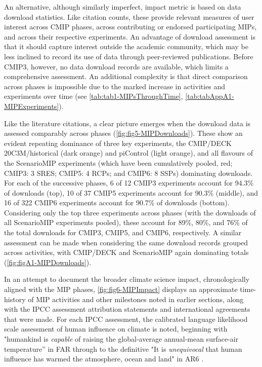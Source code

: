 \documentclass[manuscript]{copernicus}
\begin{document}
An alternative, although similarly imperfect, impact metric is based on data download statistics. Like citation counts, these provide relevant measures of user interest across CMIP phases, across contributing or endorsed participating MIPs, and across their respective experiments. An advantage of download assessment is that it should capture interest outside the academic community, which may be less inclined to record its use of data through peer-reviewed publications. Before CMIP3, however, no data download records are available, which limits a comprehensive assessment. An additional complexity is that direct comparison across phases is impossible due to the marked increase in activities and experiments over time (see \autoref{tab:tab1-MIPsThroughTime}, \autoref{tab:tabAppA1-MIPExperiments}).

Like the literature citations, a clear picture emerges when the download data is assessed comparably across phases (\autoref{fig:fig5-MIPDownloads}). These show an evident repeating dominance of three key experiments, the CMIP/DECK 20C3M/historical (dark orange) and piControl (light orange), and all flavours of the ScenarioMIP experiments (which have been cumulatively pooled, red; CMIP3: 3 SRES; CMIP5: 4 RCPs; and CMIP6: 8 SSPs) dominating downloads. For each of the successive phases, 6 of 12 CMIP3 experiments account for 94.3\% of downloads (top), 10 of 37 CMIP5 experiments account for 90.3\% (middle), and 16 of 322 CMIP6 experiments account for 90.7\% of downloads (bottom). Considering only the top three experiments across phases (with the downloads of all ScenarioMIP experiments pooled), these account for 89\%, 80\%, and 76\% of the total downloads for CMIP3, CMIP5, and CMIP6, respectively. A similar assessment can be made when considering the same download records grouped across activities, with CMIP/DECK and ScenarioMIP again dominating totals (\autoref{fig:figA1-MIPDownloads}).

In an attempt to document the broader climate science impact, chronologically aligned with the MIP phases, \autoref{fig:fig6-MIPImpact} displays an approximate time-history of MIP activities and other milestones noted in earlier sections, along with the IPCC assessment attribution statements and international agreements that were made. For each IPCC assessment, the calibrated language likelihood scale \citep[e.g.,][]{mastrandrea_guidance_2010} assessment of human influence on climate is noted, beginning with "humankind is \textit{capable} of raising the global-average annual-mean surface-air temperature” in FAR \citep{ipcc_policymakers_1990} through to the definitive "It is \textit{unequivocal} that human influence has warmed the atmosphere, ocean and land" in AR6 \citep{ipcc_summary_2021}.
\end{document}
